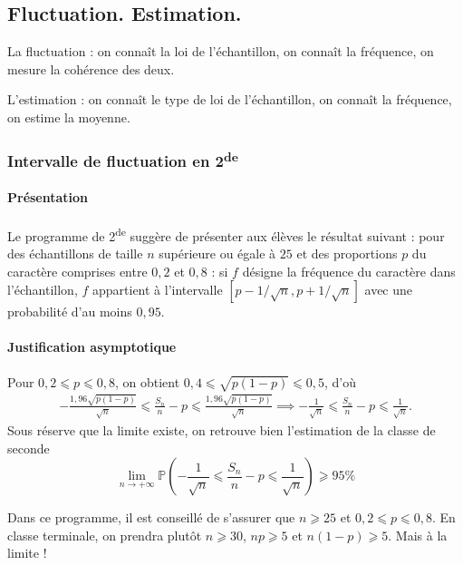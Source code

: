 \subsection{Fluctuation. Estimation.}
La fluctuation : on connaît la loi de l'échantillon, on connaît la fréquence, on mesure la cohérence des deux.

L'estimation : on connaît le type de loi de l'échantillon, on connaît la fréquence, on estime la moyenne.
\subsubsection[Intervalle de fluctuation en 2de]{Intervalle de fluctuation en 2\textsuperscript{de}}
\paragraph{Présentation}
Le programme de 2\textsuperscript{de} suggère de présenter aux élèves le résultat suivant : pour des échantillons de
taille \(𝑛\) supérieure ou égale à \(25\) et des proportions \(𝑝\) du caractère comprises entre
\(0,2\) et \(0,8\) : si \(𝑓\) désigne la fréquence du caractère dans l’échantillon,
\(𝑓\) appartient à l’intervalle \(\left[𝑝-1/\sqrt{𝑛},𝑝+1/\sqrt{𝑛}\right]\) avec une probabilité d’au moins
\(0,95\).
\paragraph{Justification asymptotique}
Pour \(0,2⩽𝑝⩽0,8\), on obtient \(0,4⩽\sqrt{𝑝(1-𝑝)}⩽0,5\), d'où
\begin{gather*}
-\frac{1,96\sqrt{𝑝(1-𝑝)}}{\sqrt{𝑛}}⩽\frac{𝑆_{𝑛}}{𝑛}-𝑝⩽\frac{1,96\sqrt{𝑝(1-𝑝)}}{\sqrt{𝑛}}
⟹
-\frac1{\sqrt{𝑛}}⩽\frac{𝑆_{𝑛}}{𝑛}-𝑝⩽\frac 1{\sqrt{𝑛}}.
\end{gather*}
Sous réserve que la limite existe, on retrouve bien l'estimation de la classe de seconde
\begin{equation*}
\lim _{n→+∞}ℙ\left(-\frac 1{\sqrt n}⩽\frac{𝑆_{𝑛}}{𝑛}-𝑝⩽\frac 1{\sqrt n}\right)⩾95\text{\%}
\end{equation*}
\begin{remark}
Dans ce programme, il est conseillé de s'assurer que \(𝑛⩾25\) et \(0,2⩽𝑝⩽0,8\). En
classe terminale, on prendra plutôt \(𝑛⩾30\), \(𝑛𝑝⩾5\) et \(𝑛(1-𝑝)⩾5\). Mais  à la limite !
\end{remark}
